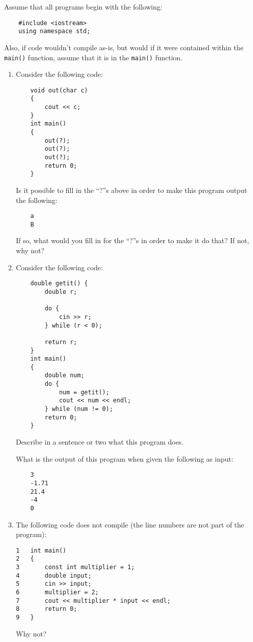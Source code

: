 \documentclass[12pt]{article}
\begin{document}
Assume that all programs begin with the following:
\begin{verbatim}
    #include <iostream>
    using namespace std;
\end{verbatim}

Also, if code wouldn't compile as-is, but would if it were contained
within the \texttt{main()} function, assume that it is in the
\texttt{main()} function.

\begin{enumerate}

\item Consider the following code:
  \begin{verbatim}
    void out(char c) 
    {
        cout << c;
    }
    int main() 
    {
        out(?);
        out(?);
        out(?);
        return 0;
    }
  \end{verbatim}

  Is it possible to fill in the ``?''s above in order to make this
  program output the following:
  \begin{verbatim}
    a
    B
  \end{verbatim}

  If so, what would you fill in for the ``?''s in order to make it do
  that?  If not, why not?
  \newpage

\item Consider the following code:
  \begin{verbatim}
    double getit() {
        double r;

        do {
            cin >> r;
        } while (r < 0);
      
        return r;
    }
    int main()
    {
        double num;
        do {
            num = getit();
            cout << num << endl;
        } while (num != 0);
        return 0;
    }
  \end{verbatim}

  Describe in a sentence or two what this program does.  \bigskip
  \bigskip

  What is the output of this program when given the following as input:
  \begin{verbatim}
    3
    -1.71
    21.4
    -4
    0
  \end{verbatim}
  \newpage

\item The following code does not compile (the line numbers are not part
of the program):
  \begin{verbatim}
1   int main() 
2   {
3       const int multiplier = 1;
4       double input;
5       cin >> input;
6       multiplier = 2;
7       cout << multiplier * input << endl;
8       return 0;
9   }
  \end{verbatim}

  Why not?
\end{enumerate}
  
\end{document}
